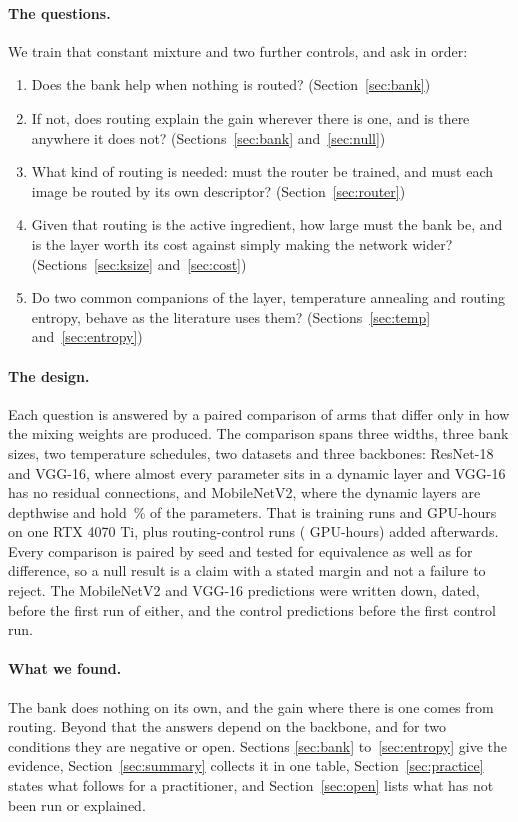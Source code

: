 \documentclass[10pt,a4paper]{article}
\begin{document}
\paragraph{The questions.} We train that constant mixture and two further
controls, and ask in order:
\begin{enumerate}\setlength\itemsep{1pt}
\item Does the bank help when nothing is routed? (Section~\ref{sec:bank})
\item If not, does routing explain the gain wherever there is one, and is
there anywhere it does not? (Sections~\ref{sec:bank} and~\ref{sec:null})
\item What kind of routing is needed: must the router be trained, and must
each image be routed by its own descriptor? (Section~\ref{sec:router})
\item Given that routing is the active ingredient, how large must the bank
be, and is the layer worth its cost against simply making the network wider?
(Sections~\ref{sec:ksize} and~\ref{sec:cost})
\item Do two common companions of the layer, temperature annealing and
routing entropy, behave as the literature uses them?
(Sections~\ref{sec:temp} and~\ref{sec:entropy})
\end{enumerate}

\paragraph{The design.} Each question is answered by a paired comparison of
arms that differ only in how the mixing weights are produced. The comparison
spans three widths, three bank sizes, two temperature schedules, two
datasets and three backbones: ResNet-18 and VGG-16, where almost every
parameter sits in a dynamic layer and VGG-16 has no residual connections, and
MobileNetV2, where the dynamic layers are depthwise and hold
\,\% of the parameters. That is  training runs and
 GPU-hours on one RTX 4070 Ti, plus  routing-control
runs ( GPU-hours) added afterwards. Every comparison is paired by
seed and tested for equivalence as well as for difference, so a null result
is a claim with a stated margin and not a failure to reject. The MobileNetV2
and VGG-16 predictions were written down, dated, before the first run of
either, and the control predictions before the first control run.

\paragraph{What we found.} The bank does nothing on its own, and the gain
where there is one comes from routing. Beyond that the answers depend on the
backbone, and for two conditions they are negative or open. Sections
\ref{sec:bank} to~\ref{sec:entropy} give the evidence, Section~\ref{sec:summary}
collects it in one table, Section~\ref{sec:practice} states what follows for
a practitioner, and Section~\ref{sec:open} lists what has not been run or
explained.
\end{document}
